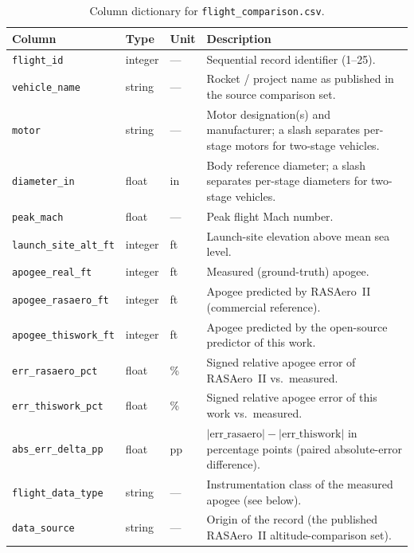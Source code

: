 \begin{table}[htbp]
\centering
\caption{Column dictionary for \texttt{flight\_comparison.csv}.}
\label{tab:cols_comparison}
\small
\begin{tabularx}{\textwidth}{@{}lll X@{}}
\toprule
Column & Type & Unit & Description \\
\midrule
\texttt{flight\_id}          & integer & ---     & Sequential record identifier (1--25). \\
\texttt{vehicle\_name}       & string  & ---     & Rocket / project name as published in the source comparison set. \\
\texttt{motor}               & string  & ---     & Motor designation(s) and manufacturer; a slash separates per-stage motors for two-stage vehicles. \\
\texttt{diameter\_in}        & float   & in      & Body reference diameter; a slash separates per-stage diameters for two-stage vehicles. \\
\texttt{peak\_mach}          & float   & ---     & Peak flight Mach number. \\
\texttt{launch\_site\_alt\_ft} & integer & ft    & Launch-site elevation above mean sea level. \\
\texttt{apogee\_real\_ft}    & integer & ft      & Measured (ground-truth) apogee. \\
\texttt{apogee\_rasaero\_ft} & integer & ft      & Apogee predicted by RASAero~II (commercial reference). \\
\texttt{apogee\_thiswork\_ft} & integer & ft     & Apogee predicted by the open-source predictor of this work. \\
\texttt{err\_rasaero\_pct}   & float   & \%      & Signed relative apogee error of RASAero~II vs.\ measured. \\
\texttt{err\_thiswork\_pct}  & float   & \%      & Signed relative apogee error of this work vs.\ measured. \\
\texttt{abs\_err\_delta\_pp} & float   & pp      & $|\text{err\_rasaero}|-|\text{err\_thiswork}|$ in percentage points (paired absolute-error difference). \\
\texttt{flight\_data\_type}  & string  & ---     & Instrumentation class of the measured apogee (see below). \\
\texttt{data\_source}        & string  & ---     & Origin of the record (the published RASAero~II altitude-comparison set). \\
\bottomrule
\end{tabularx}
\end{table}

